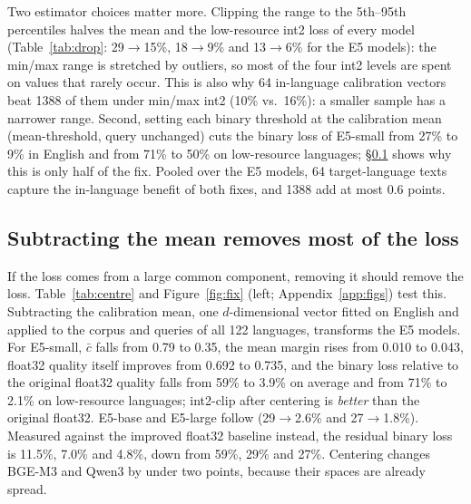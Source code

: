\documentclass[11pt]{article}
\begin{document}
Two estimator choices matter more. Clipping the range to the 5th--95th percentiles halves the mean and the low-resource int2 loss of every model (Table~\ref{tab:drop}: 29$\to$15\%, 18$\to$9\% and 13$\to$6\% for the E5 models): the min/max range is stretched by outliers, so most of the four int2 levels are spent on values that rarely occur. This is also why 64 in-language calibration vectors beat 1388 of them under min/max int2 (10\% vs.\ 16\%): a smaller sample has a narrower range. Second, setting each binary threshold at the calibration mean (mean-threshold, query unchanged) cuts the binary loss of E5-small from 27\% to 9\% in English and from 71\% to 50\% on low-resource languages; \S\ref{sec:whiten} shows why this is only half of the fix. Pooled over the E5 models, 64 target-language texts capture the in-language benefit of both fixes, and 1388 add at most 0.6 points.

\subsection{Subtracting the mean removes most of the loss}\label{sec:whiten}

If the loss comes from a large common component, removing it should remove the loss. Table~\ref{tab:centre} and Figure~\ref{fig:fix} (left; Appendix~\ref{app:figs}) test this. Subtracting the calibration mean, one $d$-dimensional vector fitted on English and applied to the corpus and queries of all 122 languages, transforms the E5 models. For E5-small, $\bar c$ falls from 0.79 to 0.35, the mean margin rises from 0.010 to 0.043, float32 quality itself improves from 0.692 to 0.735, and the binary loss relative to the original float32 quality falls from 59\% to 3.9\% on average and from 71\% to 2.1\% on low-resource languages; int2-clip after centering is \emph{better} than the original float32. E5-base and E5-large follow (29$\to$2.6\% and 27$\to$1.8\%). Measured against the improved float32 baseline instead, the residual binary loss is 11.5\%, 7.0\% and 4.8\%, down from 59\%, 29\% and 27\%. Centering changes BGE-M3 and Qwen3 by under two points, because their spaces are already spread.
\end{document}
